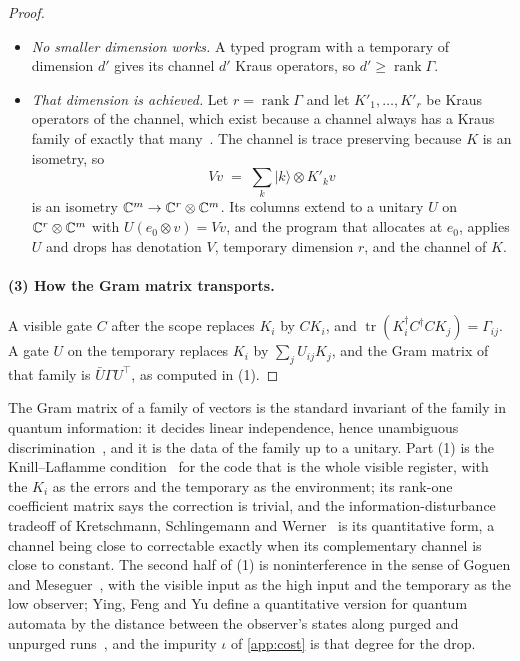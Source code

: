 \documentclass[acmsmall,screen,review,anonymous,nonacm]{acmart}
\begin{document}
\begin{proof}
\begin{itemize}
\item \emph{No smaller dimension works.} A typed program with a temporary of
  dimension $d'$ gives its channel $d'$ Kraus operators, so $d' \ge
  \operatorname{rank}\Gamma$.

\item \emph{That dimension is achieved.} Let $r = \operatorname{rank}\Gamma$
  and let $K'_1, \ldots, K'_r$ be Kraus operators of the channel, which exist
  because a channel always has a Kraus family of exactly that
  many~\cite{Choi1975CP,Watrous2018TQI}. The channel is trace preserving because $K$ is an
  isometry, so
  \[
    V v \;=\; \sum_k |k\rangle \otimes K'_k v
  \]
  is an isometry $\mathbb{C}^{m} \to \mathbb{C}^{r} \otimes \mathbb{C}^{m}$. Its columns extend to a
  unitary $U$ on $\mathbb{C}^{r} \otimes \mathbb{C}^{m}$ with $U(e_0 \otimes v) = Vv$, and
  the program that allocates at $e_0$, applies $U$ and drops has denotation
  $V$, temporary dimension $r$, and the channel of $K$.
\end{itemize}

\paragraph{(3) How the Gram matrix transports.} A visible gate $C$ after the
scope replaces $K_i$ by $CK_i$, and $\operatorname{tr}(K_i^{\dagger}
C^{\dagger} C K_j) = \Gamma_{ij}$. A gate $U$ on the temporary replaces $K_i$
by $\sum_j U_{ij} K_j$, and the Gram matrix of that family is $\bar U \Gamma
U^{\top}$, as computed in (1).
\end{proof}

The Gram matrix of a family of vectors is the standard invariant of the
family in quantum information: it decides linear independence, hence
unambiguous discrimination~\cite{Chefles1998Unambiguous}, and it is the
data of the family up to a unitary. Part (1) is the Knill--Laflamme
condition~\cite{Knill1997Theory} for the code that is the whole visible
register, with the $K_i$ as the errors and the temporary as the
environment; its rank-one coefficient matrix says the correction is
trivial, and the information-disturbance tradeoff of Kretschmann,
Schlingemann and Werner~\cite{Kretschmann2008Tradeoff} is its quantitative
form, a channel being close to correctable exactly when its complementary
channel is close to constant. The second half of (1) is noninterference in
the sense of Goguen and Meseguer~\cite{Goguen1982Security}, with the
visible input as the high input and the temporary as the low observer; Ying,
Feng and Yu define a quantitative version for quantum automata by the
distance between the observer's states along purged and unpurged
runs~\cite{Ying2013Noninterference}, and the impurity $\iota$ of
\cref{app:cost} is that degree for the drop.
\end{document}
